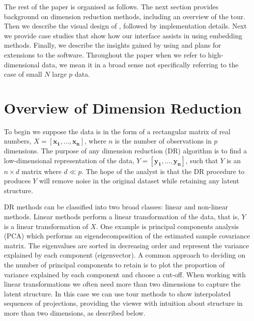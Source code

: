 \documentclass[article,notitle]{jdssv}
\begin{document}
The rest of the paper is organised as follows. The next section provides
background on dimension reduction methods, including an overview of the tour.
Then we describe the visual design of , followed by implementation
details. Next we provide case studies that show how our interface assists
in using embedding methods. Finally, we describe the insights gained by using
 and plans for extensions to the software. Throughout the paper
when we refer to high-dimensional data, we mean it in a broad sense not
specifically referring to the case of small \(N\) large \(p\) data.

\hypertarget{overview-of-dimension-reduction}{%
\section{Overview of Dimension Reduction}\label{overview-of-dimension-reduction}}

To begin we suppose the data is in the form of a rectangular
matrix of real numbers, \(X = [\mathbf{x_1}, \dots, \mathbf{x_n}]\), where \(n\) is
the number of observations in \(p\) dimensions. The purpose of any dimension reduction (DR) algorithm
is to find a low-dimensional representation of the data,
\(Y = [\mathbf{y_1}, \dots, \mathbf{y_n}]\), such that \(Y\) is an \(n \times d\)
matrix where \(d \ll p\). The hope of the analyst is that the DR procedure to
produces \(Y\) will remove noise in the original dataset while retaining any
latent structure.

DR methods can be classified into two broad classes: linear and non-linear
methods. Linear methods perform a linear transformation of the data, that is,
\(Y\) is a linear transformation of \(X\). One example is principal components
analysis (PCA) which performs an eigendecomposition of the estimated sample
covariance matrix. The eigenvalues are sorted in decreasing order and represent
the variance explained by each component (eigenvector).
A common approach to deciding on the number of principal components to retain is
to plot the proportion of variance explained by each component and choose a
cut-off.
When working with linear transformations we often need more than two dimensions
to capture the latent structure. In this case we can use tour methods
\citep{Asimov1985-vp, Buja1986-zr} to show interpolated sequences of projections,
providing the viewer with intuition about structure in more than two
dimensions, as described below.
\end{document}
